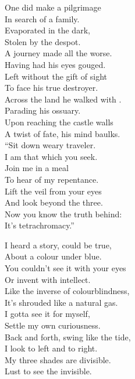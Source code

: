 One did make a pilgrimage \\
In search of a family. \\
Evaporated in the dark, \\
Stolen by the despot. \\
A journey made all the worse. \\
Having had his eyes gouged. \\
Left without the gift of sight \\
To face his true destroyer. \\

Across the land he walked with . \\
Parading his ossuary. \\
Upon reaching the castle walls \\
A twist of fate, his mind baulks. \\

``Sit down weary traveler. \\
I am that which you seek. \\
Join me in a meal \\
To hear of my repentance. \\
Lift the veil from your eyes \\
And look beyond the three. \\
Now you know the truth behind: \\
It's tetrachromacy.'' \\





I heard a story, could be true, \\
About a colour under blue. \\
You couldn't see it with your eyes \\
Or invent with intellect. \\

Like the inverse of colourblindness, \\
It's shrouded like a natural gas. \\
I gotta see it for myself, \\
Settle my own curiousness. \\

Back and forth, swing like the tide, \\
I look to left and to right. \\
My three shades are divisible. \\
Lust to see the invisible. \\

